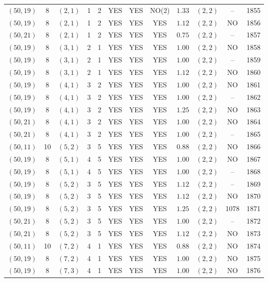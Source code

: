 \begin{longtable}{|c|c|c|c|c|c|c|c|c|c|c|c|}
$(50,19)$ & 8 & $(2,1)$ & 1 & 2 & YES & YES & NO(2) & $1.33$ & $(2,2)$ & -- & 1855\\
$(50,19)$ & 8 & $(2,1)$ & 1 & 2 & YES & YES & YES & $1.12$ & $(2,2)$ & NO & 1856\\
$(50,21)$ & 8 & $(2,1)$ & 1 & 2 & YES & YES & YES & $0.75$ & $(2,2)$ & -- & 1857\\
$(50,19)$ & 8 & $(3,1)$ & 2 & 1 & YES & YES & YES & $1.00$ & $(2,2)$ & NO & 1858\\
$(50,19)$ & 8 & $(3,1)$ & 2 & 1 & YES & YES & YES & $1.00$ & $(2,2)$ & -- & 1859\\
$(50,19)$ & 8 & $(3,1)$ & 2 & 1 & YES & YES & YES & $1.12$ & $(2,2)$ & NO & 1860\\
$(50,19)$ & 8 & $(4,1)$ & 3 & 2 & YES & YES & YES & $1.00$ & $(2,2)$ & NO & 1861\\
$(50,19)$ & 8 & $(4,1)$ & 3 & 2 & YES & YES & YES & $1.00$ & $(2,2)$ & -- & 1862\\
$(50,19)$ & 8 & $(4,1)$ & 3 & 2 & YES & YES & YES & $1.25$ & $(2,2)$ & NO & 1863\\
$(50,21)$ & 8 & $(4,1)$ & 3 & 2 & YES & YES & YES & $1.00$ & $(2,2)$ & NO & 1864\\
$(50,21)$ & 8 & $(4,1)$ & 3 & 2 & YES & YES & YES & $1.00$ & $(2,2)$ & -- & 1865\\
$(50,11)$ & 10 & $(5,2)$ & 3 & 5 & YES & YES & YES & $0.88$ & $(2,2)$ & NO & 1866\\
$(50,19)$ & 8 & $(5,1)$ & 4 & 5 & YES & YES & YES & $1.00$ & $(2,2)$ & NO & 1867\\
$(50,19)$ & 8 & $(5,1)$ & 4 & 5 & YES & YES & YES & $1.00$ & $(2,2)$ & -- & 1868\\
$(50,19)$ & 8 & $(5,2)$ & 3 & 5 & YES & YES & YES & $1.12$ & $(2,2)$ & -- & 1869\\
$(50,19)$ & 8 & $(5,2)$ & 3 & 5 & YES & YES & YES & $1.12$ & $(2,2)$ & NO & 1870\\
$(50,19)$ & 8 & $(5,2)$ & 3 & 5 & YES & YES & YES & $1.25$ & $(2,2)$ & 1078 & 1871\\
$(50,21)$ & 8 & $(5,2)$ & 3 & 5 & YES & YES & YES & $1.00$ & $(2,2)$ & -- & 1872\\
$(50,21)$ & 8 & $(5,2)$ & 3 & 5 & YES & YES & YES & $1.12$ & $(2,2)$ & NO & 1873\\
$(50,11)$ & 10 & $(7,2)$ & 4 & 1 & YES & YES & YES & $0.88$ & $(2,2)$ & NO & 1874\\
$(50,19)$ & 8 & $(7,2)$ & 4 & 1 & YES & YES & YES & $1.00$ & $(2,2)$ & NO & 1875\\
$(50,19)$ & 8 & $(7,3)$ & 4 & 1 & YES & YES & YES & $1.00$ & $(2,2)$ & NO & 1876\\

\end{longtable}
